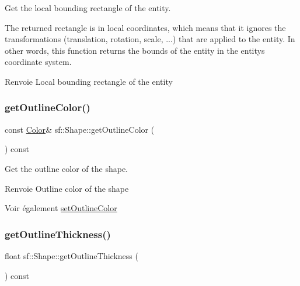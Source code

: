 Get the local bounding rectangle of the entity. 

The returned rectangle is in local coordinates, which means that it ignores the transformations (translation, rotation, scale, ...) that are applied to the entity. In other words, this function returns the bounds of the entity in the entity\textquotesingle{}s coordinate system.

\begin{DoxyReturn}{Renvoie}
Local bounding rectangle of the entity 
\end{DoxyReturn}
\mbox{\label{classsf_1_1Shape_a6598feed5fea1325a36b0f3a615ac55c}} 
\subsubsection{\texorpdfstring{get\+Outline\+Color()}{getOutlineColor()}}
{\footnotesize\ttfamily const \hyperlink{classsf_1_1Color}{Color}\& sf\+::\+Shape\+::get\+Outline\+Color (\begin{DoxyParamCaption}{ }\end{DoxyParamCaption}) const}



Get the outline color of the shape. 

\begin{DoxyReturn}{Renvoie}
Outline color of the shape
\end{DoxyReturn}
\begin{DoxySeeAlso}{Voir également}
\hyperlink{classsf_1_1Shape_a5978f41ee349ac3c52942996dcb184f7}{set\+Outline\+Color} 
\end{DoxySeeAlso}
\mbox{\label{classsf_1_1Shape_a1d4d5299c573a905e5833fc4dce783a7}} 
\subsubsection{\texorpdfstring{get\+Outline\+Thickness()}{getOutlineThickness()}}
{\footnotesize\ttfamily float sf\+::\+Shape\+::get\+Outline\+Thickness (\begin{DoxyParamCaption}{ }\end{DoxyParamCaption}) const}



